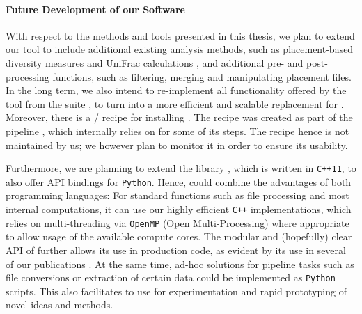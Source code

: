 
\paragraph{Future Development of our Software}
\label{ch:ConclusionOutlook:sec:UsabilityScalability:par:FutureOfOurSoftware}

With respect to the methods and tools presented in this thesis,
we plan to extend our  tool \cite{Czech2019-genesis-gappa} to include additional existing analysis methods,
such as placement-based diversity measures \cite{Matsen2010} and UniFrac calculations \cite{Lozupone2005},
and additional pre- and post-processing functions, such as filtering, merging and manipulating placement files.
In the long term, we also intend to re-implement all functionality offered by the
 tool from the  suite \cite{Matsen2010},
to turn  into a more efficient and scalable replacement for .
Moreover, there is a / \cite{Gruning2018} recipe
for installing  \cite{Douglas2018-gappa}.
The recipe was created as part of the  pipeline \cite{Douglas2019},
which internally relies on  for some of its steps.
The recipe hence is not maintained by us;
we however plan to monitor it in order to ensure its usability.

Furthermore, we are planning to extend the  library \cite{Czech2019-genesis-gappa},
which is written in \texttt{C++11}, to also offer \acs{API} bindings for \texttt{Python}.
Hence,  could combine the advantages of both programming languages:
For standard functions such as file processing and most internal computations,
it can use our highly efficient \texttt{C++} implementations,
which relies on multi-threading via \texttt{OpenMP} (Open Multi-Processing)
where appropriate to allow usage of the available compute cores.
The modular and (hopefully) clear \acs{API} of  further allows its use in production code,
as evident by its use in several of our publications
\cite{Mahe2017,Barbera2018,Zhou2017,Czech2018-phat,Czech2019-analysis,Czech2019-genesis-gappa}.
At the same time, ad-hoc solutions for pipeline tasks such as file conversions or extraction of certain data
could be implemented as \texttt{Python} scripts.
This also facilitates to use  for experimentation and rapid prototyping of novel ideas and methods.

